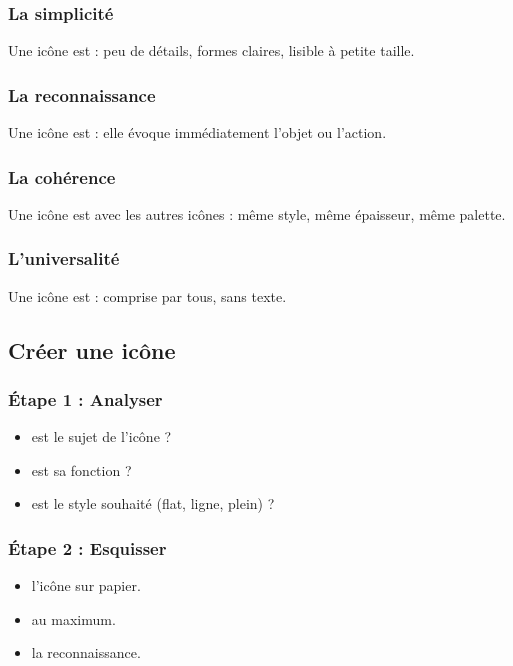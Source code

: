 \subsubsection{La simplicité}

Une icône est  : peu de détails, formes claires, lisible à petite taille.

\subsubsection{La reconnaissance}

Une icône est  : elle évoque immédiatement l'objet ou l'action.

\subsubsection{La cohérence}

Une icône est  avec les autres icônes : même style, même épaisseur, même palette.

\subsubsection{L'universalité}

Une icône est  : comprise par tous, sans texte.

\subsection{Créer une icône}

\subsubsection{Étape 1 : Analyser}

\begin{itemize}
    \item {} est le sujet de l'icône ?
    \item {} est sa fonction ?
    \item {} est le style souhaité (flat, ligne, plein) ?
\end{itemize}

\subsubsection{Étape 2 : Esquisser}

\begin{itemize}
    \item {} l'icône sur papier.
    \item {} au maximum.
    \item {} la reconnaissance.
\end{itemize}


